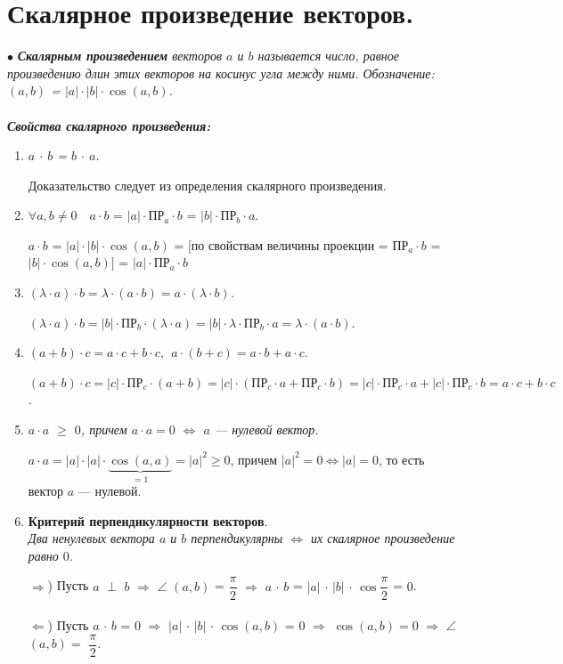 \section{Скалярное произведение векторов.}
$\bullet$ \textit{\textbf{Скалярным произведением} векторов $a$ и $b$ называется число, равное произведению длин этих векторов на косинус угла между ними. Обозначение: $(a, b)$ = $|a|\cdot|b|\cdot \cos(a,b)$.}\\\\
\textbf{\textit{Свойства скалярного произведения:}}\begin{enumerate}
	\item \textit{$a$ $\cdot$ $b$ = $b$ $\cdot$ $a$.}
	\begin{Proof} Доказательство следует из определения скалярного произведения.\end{Proof}
	\item $\forall a, b \ne 0\quad a\cdot b$ = $|a| \cdot\text{ПР}_a \cdot b$ = $|b| \cdot\text{ПР}_b \cdot a$.
	\begin{Proof} $a\cdot b$ = $|a| \cdot |b| \cdot \cos(a,b)$ = $[$по свойствам величины проекции = ПР$_a \cdot b$ = $|b| \cdot \cos(a, b)]$ = $|a| \cdot\text{ПР}_a \cdot b$ \end{Proof}
	\item \textit{$(\lambda\cdot a)\cdot b = \lambda\cdot( a\cdot b) = a\cdot(\lambda\cdot b)$.}
	\begin{Proof} $(\lambda\cdot a )\cdot b = |b| \cdot\text{ПР}_b \cdot(\lambda\cdot a) =|b|\cdot\lambda\cdot\text{ПР}_b\cdot a = \lambda\cdot(a\cdot b)$.\end{Proof}
	\item $(a+b)\cdot c = a\cdot c + b\cdot c, \ \ a\cdot (b+c) = a\cdot b + a\cdot c.$
	\begin{Proof} $(a+b)\cdot c = |c|\cdot\text{ПР}_c\cdot(a+b) = |c|\cdot(\text{ПР}_c\cdot a+\text{ПР}_c\cdot b) = |c|\cdot\text{ПР}_c\cdot a + |c|\cdot\text{ПР}_c\cdot b = a\cdot c + b\cdot c$. \end{Proof}
	\item\textit{$a\cdot a$ $\geqslant$ $0$, причем $a\cdot a = 0$ $\Longleftrightarrow$ $a$ --- нулевой вектор.}
	\begin{Proof} $a\cdot a = |a|\cdot|a|\cdot\underbrace{\cos(a,a)}_{=1} = |a|^2 \geqslant 0$, причем $|a|^2 = 0 \Longleftrightarrow |a| = 0$, то есть вектор $a$ --- нулевой. \end{Proof}
	\item\textbf{Критерий перпендикулярности векторов}.\\ \textit{Два ненулевых вектора $a$ и $b$ перпендикулярны $\Longleftrightarrow$ их скалярное произведение равно $0$.}
	\begin{Proof} $\Rightarrow$) Пусть $a$ $\perp$ $b$ $\Rightarrow$ $\angle$ $(a, b)$ = $\dfrac{\pi}{2}$ $\Rightarrow$ $a$ $\cdot$ $b$ = $|a|$ $\cdot$ $|b|$ $\cdot$ $\cos\dfrac{\pi}{2}$ = $0$.\\\\
		$\Leftarrow$) Пусть $a$ $\cdot$ $b$ = $0$ $\Rightarrow$ $|a|$ $\cdot$ $|b|$ $\cdot$ $\cos(a,b)$ = $0$ $\Rightarrow$ $\cos(a, b) = 0$ $\Rightarrow$ $\angle$ $(a,b) =$ $\dfrac{\pi}{2}$. \end{Proof}
\end{enumerate}

